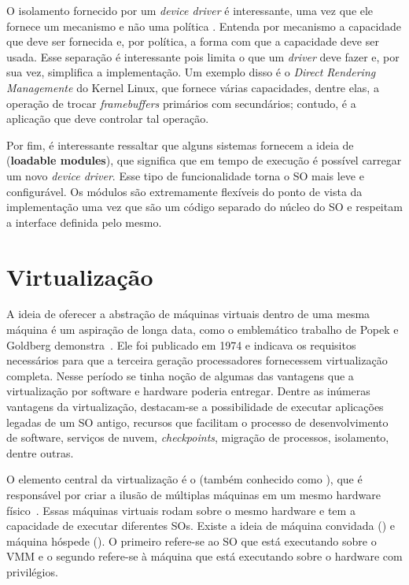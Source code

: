 O isolamento fornecido por um \emph{device driver} é interessante, uma vez que
ele fornece um mecanismo e não uma política \citep{ddbook}. Entenda por
mecanismo a capacidade que deve ser fornecida e, por política, a forma com
que a capacidade deve ser usada. Esse separação é interessante pois limita o
que um \emph{driver} deve fazer e, por sua vez, simplifica a implementação. Um
exemplo disso é o \emph{Direct Rendering Managemente} do Kernel Linux, que
fornece várias capacidades, dentre elas, a operação de trocar
\emph{framebuffers} primários com secundários; contudo, é a aplicação que deve
controlar tal operação.

Por fim, é interessante ressaltar que alguns sistemas fornecem a ideia de
 (\textbf{loadable modules}), que significa
que em tempo de execução é possível carregar um novo \emph{device driver}. Esse
tipo de funcionalidade torna o SO mais leve e configurável. Os módulos
são extremamente flexíveis do ponto de vista da implementação uma vez que são
um código separado do núcleo do SO e respeitam a interface definida pelo mesmo.

\section{Virtualização}
\label{sec:virtualizacao}


A ideia de oferecer a abstração de máquinas virtuais dentro de uma mesma
máquina é um aspiração de longa data, como o emblemático trabalho de Popek e
Goldberg demonstra~\citep{popek}. Ele foi publicado em 1974 e indicava os
requisitos necessários para que a terceira geração processadores fornecessem
virtualização completa. Nesse período se tinha noção de algumas das vantagens
que a virtualização por software e hardware poderia entregar. Dentre as
inúmeras vantagens da virtualização, destacam-se a possibilidade de executar
aplicações legadas de um SO antigo, recursos que facilitam o processo de
desenvolvimento de software, serviços de nuvem, \emph{checkpoints}, migração de
processos, isolamento, dentre outras.

O elemento central da virtualização é o  (também
conhecido como ), que é responsável por
criar a ilusão de múltiplas máquinas em um mesmo hardware
físico~\citep{tanenbaum}. Essas máquinas virtuais rodam sobre o mesmo hardware
e tem a capacidade de executar diferentes SOs. Existe a ideia de máquina
convidada () e máquina hóspede (). O
primeiro refere-se ao SO que está executando sobre o VMM e o segundo refere-se
à máquina que está executando sobre o hardware com privilégios.

